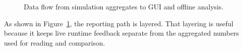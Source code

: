 \begin{figure}[htbp]
\centering
\caption{Data flow from simulation aggregates to GUI and offline analysis.}
\label{fig:results-data-flow}
\end{figure}

As shown in Figure~\ref{fig:results-data-flow}, the reporting path is layered.
That layering is useful because it keeps live runtime feedback separate from the
aggregated numbers used for reading and comparison.
